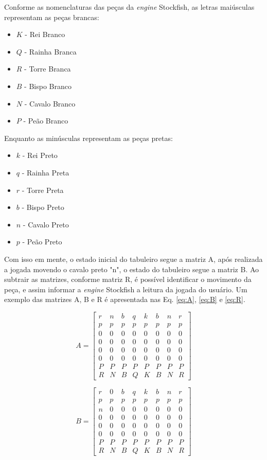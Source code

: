 \documentclass[journal]{IEEEtran} %
\begin{document}
Conforme as nomenclaturas das peças da \textit{engine} Stockfish, as letras maiúsculas representam as peças brancas:
\begin{itemize}
    \item $K$ - Rei Branco
    \item $Q$ - Rainha Branca
    \item $R$ - Torre Branca
    \item $B$ - Bispo Branco
    \item $N$ - Cavalo Branco
    \item $P$ - Peão Branco
\end{itemize}
Enquanto as minúsculas representam as peças pretas:
\begin{itemize}
    \item $k$ - Rei Preto
    \item $q$ - Rainha Preta
    \item $r$ - Torre Preta
    \item $b$ - Bispo Preto
    \item $n$ - Cavalo Preto
    \item $p$ - Peão Preto
\end{itemize}


Com isso em mente, o estado inicial do tabuleiro segue a matriz A, após realizada a jogada movendo o cavalo preto "n", o estado do tabuleiro segue a matriz B. Ao subtrair as matrizes, conforme matriz R, é possível identificar o movimento da peça, e assim informar a \textit{engine} Stockfish a leitura da jogada do usuário. Um exemplo das matrizes A, B e R é apresentada nas Eq. \eqref{eq:A}, \eqref{eq:B} e \eqref{eq:R}.

\begin{equation}
\label{eq:A}
A =
\begin{bmatrix}
r & n & b & q & k & b & n & r \\
p & p & p & p & p & p & p & p \\
0 & 0 & 0 & 0 & 0 & 0 & 0 & 0 \\
0 & 0 & 0 & 0 & 0 & 0 & 0 & 0 \\
0 & 0 & 0 & 0 & 0 & 0 & 0 & 0 \\
0 & 0 & 0 & 0 & 0 & 0 & 0 & 0 \\
P & P & P & P & P & P & P & P \\
R & N & B & Q & K & B & N & R
\end{bmatrix}
\end{equation}

\begin{equation}
\label{eq:B}
B =
\begin{bmatrix}
r & 0 & b & q & k & b & n & r \\
p & p & p & p & p & p & p & p \\
n & 0 & 0 & 0 & 0 & 0 & 0 & 0 \\
0 & 0 & 0 & 0 & 0 & 0 & 0 & 0 \\
0 & 0 & 0 & 0 & 0 & 0 & 0 & 0 \\
0 & 0 & 0 & 0 & 0 & 0 & 0 & 0 \\
P & P & P & P & P & P & P & P \\
R & N & B & Q & K & B & N & R
\end{bmatrix}
\end{equation}
\end{document}
